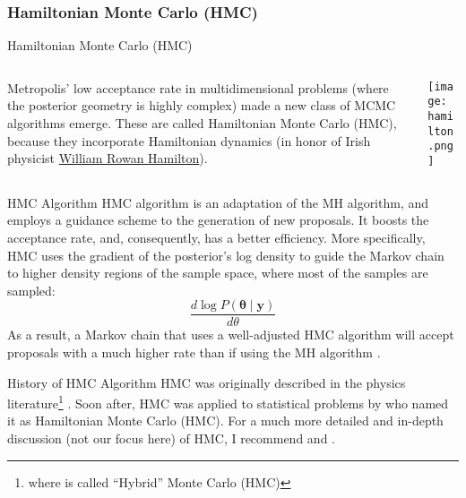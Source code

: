 \subsubsection{Hamiltonian Monte Carlo (HMC)}
\begin{frame}{Hamiltonian Monte Carlo (HMC)}
	\begin{columns}
		\begin{column}{0.8\textwidth}
			Metropolis' low acceptance rate in multidimensional problems
			(where the posterior geometry is highly complex)
			made a new class of MCMC algorithms emerge.
			These are called Hamiltonian Monte Carlo (HMC),
			because they incorporate Hamiltonian dynamics
			(in honor of Irish physicist
			\href{https://en.wikipedia.org/wiki/William_Rowan_Hamilton}{William Rowan Hamilton}).
		\end{column}
		\begin{column}{0.2\textwidth}
			\texttt{[image: hamilton.png]}
		\end{column}
	\end{columns}
\end{frame}

\begin{frame}{HMC Algorithm}
	HMC algorithm is an adaptation of the MH algorithm,
	and employs a guidance scheme to the generation of new proposals.
	It boosts the acceptance rate, and, consequently, has a better efficiency.
	\vfill
	More specifically, HMC uses the gradient of the posterior's log density
	to guide the Markov chain to higher density regions of the sample space,
	where most of the samples are sampled:
	$$
		\frac{d \log P(\boldsymbol{\theta} \mid \mathbf{y})}{d \theta}
	$$
	As a result, a Markov chain that uses a well-adjusted HMC algorithm will accept
	proposals with a much higher rate than if using the MH algorithm
	\parencite{robertsWeakConvergenceOptimal1997, beskosOptimalTuningHybrid2013}.
\end{frame}

\begin{frame}{History of HMC Algorithm}
	HMC was originally described in the physics literature\footnote{where is called ``Hybrid'' Monte Carlo (HMC)}
	\parencite{duaneHybridMonteCarlo1987}.
	\vfill
	Soon after, HMC was applied to statistical problems by
	\textcite{nealImprovedAcceptanceProcedure1994} who named it as Hamiltonian Monte Carlo (HMC).
	\vfill
	For a much more detailed and in-depth discussion (not our focus here) of HMC,
	I recommend
	\textcite{neal2011mcmc} and \textcite{betancourtConceptualIntroductionHamiltonian2017}.
\end{frame}

